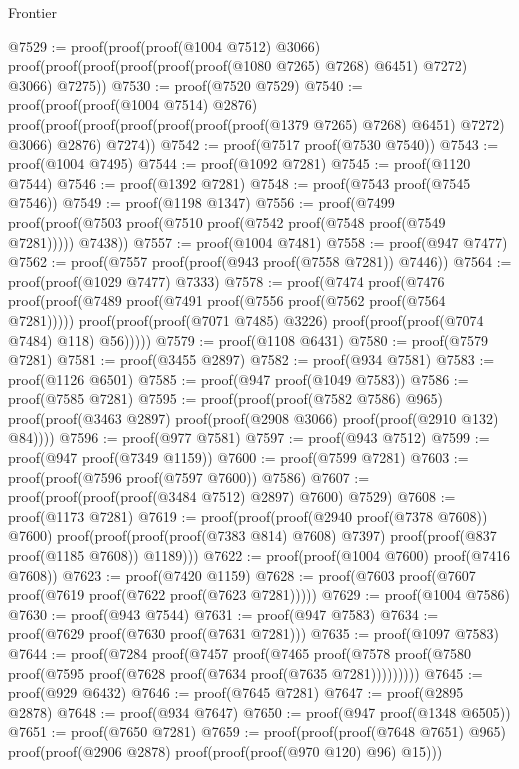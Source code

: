 \begin{lexlean}{Frontier}
\begin{coremodule}
@7529 := proof(proof(proof(@1004 @7512) @3066)
      proof(proof(proof(proof(proof(proof(@1080 @7265) @7268) @6451) @7272) @3066) @7275))
@7530 := proof(@7520 @7529)
@7540 := proof(proof(proof(@1004 @7514) @2876)
      proof(proof(proof(proof(proof(proof(proof(@1379 @7265) @7268) @6451) @7272) @3066) @2876)
          @7274))
@7542 := proof(@7517 proof(@7530 @7540))
@7543 := proof(@1004 @7495)
@7544 := proof(@1092 @7281)
@7545 := proof(@1120 @7544)
@7546 := proof(@1392 @7281)
@7548 := proof(@7543 proof(@7545 @7546))
@7549 := proof(@1198 @1347)
@7556 := proof(@7499
      proof(proof(@7503 proof(@7510 proof(@7542 proof(@7548 proof(@7549 @7281))))) @7438))
@7557 := proof(@1004 @7481)
@7558 := proof(@947 @7477)
@7562 := proof(@7557 proof(proof(@943 proof(@7558 @7281)) @7446))
@7564 := proof(proof(@1029 @7477) @7333)
@7578 := proof(@7474
      proof(@7476
          proof(proof(@7489 proof(@7491 proof(@7556 proof(@7562 proof(@7564 @7281)))))
              proof(proof(proof(@7071 @7485) @3226) proof(proof(proof(@7074 @7484) @118) @56)))))
@7579 := proof(@1108 @6431)
@7580 := proof(@7579 @7281)
@7581 := proof(@3455 @2897)
@7582 := proof(@934 @7581)
@7583 := proof(@1126 @6501)
@7585 := proof(@947 proof(@1049 @7583))
@7586 := proof(@7585 @7281)
@7595 := proof(proof(proof(@7582 @7586) @965)
      proof(proof(@3463 @2897) proof(proof(@2908 @3066) proof(proof(@2910 @132) @84))))
@7596 := proof(@977 @7581)
@7597 := proof(@943 @7512)
@7599 := proof(@947 proof(@7349 @1159))
@7600 := proof(@7599 @7281)
@7603 := proof(proof(@7596 proof(@7597 @7600)) @7586)
@7607 := proof(proof(proof(proof(@3484 @7512) @2897) @7600) @7529)
@7608 := proof(@1173 @7281)
@7619 := proof(proof(proof(@2940 proof(@7378 @7608)) @7600)
      proof(proof(proof(proof(@7383 @814) @7608) @7397)
          proof(proof(@837 proof(@1185 @7608)) @1189)))
@7622 := proof(proof(@1004 @7600) proof(@7416 @7608))
@7623 := proof(@7420 @1159)
@7628 := proof(@7603 proof(@7607 proof(@7619 proof(@7622 proof(@7623 @7281)))))
@7629 := proof(@1004 @7586)
@7630 := proof(@943 @7544)
@7631 := proof(@947 @7583)
@7634 := proof(@7629 proof(@7630 proof(@7631 @7281)))
@7635 := proof(@1097 @7583)
@7644 := proof(@7284
      proof(@7457
          proof(@7465
              proof(@7578 proof(@7580 proof(@7595 proof(@7628 proof(@7634 proof(@7635 @7281)))))))))
@7645 := proof(@929 @6432)
@7646 := proof(@7645 @7281)
@7647 := proof(@2895 @2878)
@7648 := proof(@934 @7647)
@7650 := proof(@947 proof(@1348 @6505))
@7651 := proof(@7650 @7281)
@7659 := proof(proof(proof(@7648 @7651) @965)
      proof(proof(@2906 @2878) proof(proof(proof(@970 @120) @96) @15)))

\end{coremodule}
\end{lexlean}
